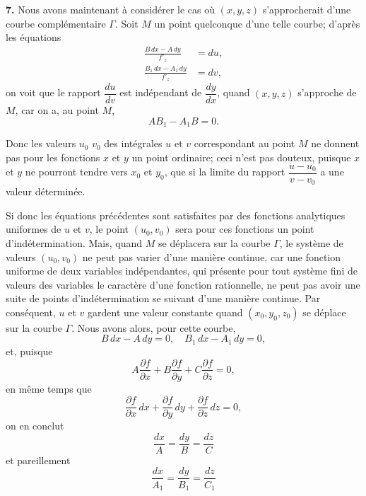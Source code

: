 \documentclass{article}
\begin{document}
\textbf{7.} Nous avons maintenant à considérer le cas où $(x, y, z)$ s'approcherait d'une courbe complémentaire $\Gamma$. Soit $M$ un point quelconque d'une telle courbe; d'après les équations
\[
\begin{aligned}
\frac{B\,dx - A\,dy}{f'_{z}} &= du, \\
\frac{B_{1}\,dx - A_{1}\,dy}{f'_{z}} &= dv,
\end{aligned}
\]
on voit que le rapport $\dfrac{du}{dv}$ est indépendant de $\dfrac{dy}{dx}$, quand $(x, y, z)$ s'approche de $M$, car on a, au point $M$,
\[
AB_{1} - A_{1}B = 0.
\]


Donc les valeurs $u_{0}$ $v_{0}$ des intégrales $u$ et $v$ correspondant au point $M$ ne donnent pas pour les fonctions $x$ et $y$ un point ordinaire; ceci n'est pas douteux, puisque $x$ et $y$ ne pourront tendre vers $x_{0}$ et $y_{0}$, que si la limite du rapport $\dfrac{u - u_{0}}{v - v_{0}}$ a une valeur déterminée.

Si donc les équations précédentes sont satisfaites par des fonctions analytiques uniformes de $u$ et $v$, le point $(u_{0}, v_{0})$ sera pour ces fonctions un point d'indétermination. Mais, quand $M$ se déplacera sur la courbe $\Gamma$, le système de valeurs $(u_{0}, v_{0})$ ne peut pas varier d'une manière continue, car une fonction uniforme de deux variables indépendantes, qui présente pour tout système fini de valeurs des variables le caractère d'une fonction rationnelle, ne peut pas avoir une suite de points d'indétermination se suivant d'une manière continue. Par conséquent, $u$ et $v$ gardent une valeur constante quand $(x_{0}, y_{0}, z_{0})$ se déplace sur la courbe $\Gamma$. Nous avons alors, pour cette courbe,
\[
B\,dx - A\,dy = 0, \quad B_{1}\,dx - A_{1}\,dy = 0,
\]
et, puisque
\[
A \frac{\partial f}{\partial x} + B \frac{\partial f}{\partial y} + C \frac{\partial f}{\partial z} = 0,
\]
en même temps que
\[
\frac{\partial f}{\partial x}\,dx + \frac{\partial f}{\partial y}\,dy + \frac{\partial f}{\partial z}\,dz = 0,
\]
on en conclut
\[
\frac{dx}{A} = \frac{dy}{B} = \frac{dz}{C}
\]
et pareillement
\[
\frac{dx}{A_{1}} = \frac{dy}{B_{1}} = \frac{dz}{C_{1}}
\]
\end{document}
